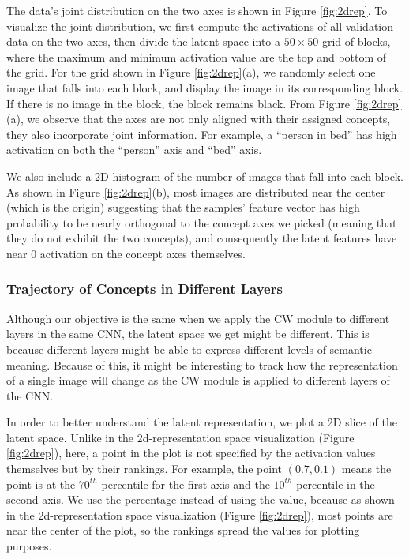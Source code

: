 \documentclass{article}
\begin{document}
The data's joint distribution on the two axes is shown in Figure \ref{fig:2drep}. To visualize the joint distribution, we first compute the activations of all validation data on the two axes, then divide the latent space into a $50\times50$ grid of blocks, where the maximum and minimum activation value are the top and bottom of the grid. For the grid shown in Figure \ref{fig:2drep}(a), we randomly select one image that falls into each block, and display the image in its corresponding block. If there is no image in the block, the block remains black. From Figure \ref{fig:2drep}(a), we  observe that the axes are not only aligned with their assigned concepts, they also incorporate joint information. For example, a ``person in bed'' has high activation on both the ``person'' axis and ``bed'' axis.

We also include a 2D histogram of the number of images that fall into each block. As shown in Figure \ref{fig:2drep}(b), most images are distributed near the center (which is the origin) suggesting that the samples' feature vector has high probability to be nearly orthogonal to the concept axes we picked (meaning that they do not exhibit the two concepts), and consequently the latent features have near $0$ activation on the concept axes themselves.

\subsubsection{Trajectory of Concepts in Different Layers} \label{sec:trajectory}

Although our objective is the same when we apply the CW module to different layers in the same CNN, the latent space we get might be different. This is because different layers might be able to express different levels of semantic meaning. Because of this, it might be interesting to track how the representation of a single image will change as the CW module is applied to different layers of the CNN.

In order to better understand the latent representation, we plot a 2D slice of the latent space. Unlike in the 2d-representation space visualization (Figure \ref{fig:2drep}), here, a point in the plot is not specified by the activation values themselves but by their rankings. For example, the point $(0.7, 0.1)$ means the point is at the $70^{th}$ percentile for the first axis and the $10^{th}$ percentile in the second axis. We use the percentage instead of using the value, because as shown in the 2d-representation space visualization (Figure \ref{fig:2drep}), most points are near the center of the plot, so the rankings spread the values for plotting purposes.
\end{document}
